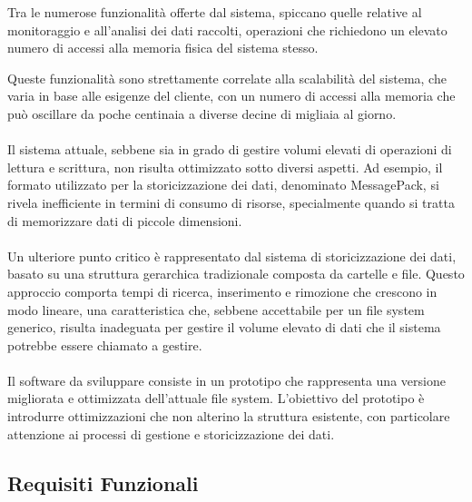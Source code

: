 \documentclass[12pt,a4paper,openright,twoside]{book}
\begin{document}
        Tra le numerose funzionalità offerte dal sistema, spiccano quelle relative al monitoraggio e all'analisi dei dati raccolti, operazioni che richiedono un elevato numero di accessi alla memoria fisica del sistema stesso.

        Queste funzionalità sono strettamente correlate alla scalabilità del sistema, che varia in base alle esigenze del cliente, con un numero di accessi alla memoria che può oscillare da poche centinaia a diverse decine di migliaia al giorno.

        \paragraph*{}

        Il sistema attuale, sebbene sia in grado di gestire volumi elevati di operazioni di lettura e scrittura, non risulta ottimizzato sotto diversi aspetti. Ad esempio, il formato utilizzato per la storicizzazione dei dati, denominato MessagePack, si rivela inefficiente in termini di consumo di risorse, specialmente quando si tratta di memorizzare dati di piccole dimensioni.

        \paragraph*{}

        Un ulteriore punto critico è rappresentato dal sistema di storicizzazione dei dati, basato su una struttura gerarchica tradizionale composta da cartelle e file. Questo approccio comporta tempi di ricerca, inserimento e rimozione che crescono in modo lineare, una caratteristica che, sebbene accettabile per un file system generico, risulta inadeguata per gestire il volume elevato di dati che il sistema potrebbe essere chiamato a gestire.

        \paragraph*{}

        Il software da sviluppare consiste in un prototipo che rappresenta una versione migliorata e ottimizzata dell'attuale file system. L'obiettivo del prototipo è introdurre ottimizzazioni che non alterino la struttura esistente, con particolare attenzione ai processi di gestione e storicizzazione dei dati.

        \subsection{Requisiti Funzionali}
            
\end{document}
